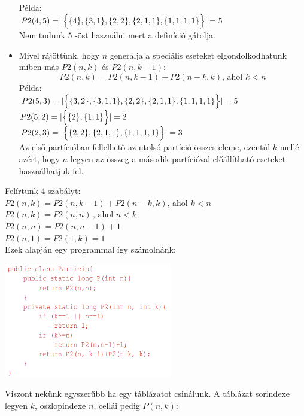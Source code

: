 \documentclass{article}
\theoremstyle{mytheoremstyle}
\theoremstyle{mytheoremstyle}
\theoremstyle{myproblemstyle}
\begin{document}
\begin{itemize}
Példa:\\
$P2(4,5) = |\Bigl\{\{4\},\{3,1\},\{2,2\},\{2,1,1\},
\{1,1,1,1\}\Bigr\}|=5$\\ 
Nem tudunk $5$ -öst használni mert a definíció gátolja.
\item
Mivel rájöttünk, hogy $n$ generálja a speciális eseteket 
elgondolkodhatunk miben más $P2(n,k)$ és $P2(n,k-1):$
$$P2(n,k) = P2(n,k-1) + P2(n-k,k)\text{, ahol }k<n$$
Példa:\\
$P2(5,3) = |\Bigl\{\{3,2\},\{3,1,1\},\{2,2\},\{2,1,1\},\{1,1,1,1\}\Bigr\}|=5$\\ 
$P2(5,2) = |\Bigl\{\{2\},\{1,1\}\Bigr\}|=2$\\ 
$P2(2,3) = |\Bigl\{\{2,2\},\{2,1,1\},\{1,1,1,1\}\Bigr\}|=3$\\ 
Az első partícióban fellelhető az utolsó partíció összes eleme, ezentúl
$k$ mellé azért, hogy $n$ legyen az összeg a második 
partícióval előállítható eseteket használhatjuk fel.

\end{itemize}
Felírtunk 4 szabályt:\\
$P2(n,k) = P2(n,k-1) + P2(n-k,k)\text{, ahol }k<n$\\
$P2(n,k) = P2(n,n)\,\text{, ahol }n<k$\\
$P2(n,n) = P2(n,n-1) + 1$\\
$P2(n,1) = P2(1,k) = 1$\\
Ezek alapján egy programmal így számolnánk:\\
\begin{center}
    \includegraphics[height=5cm]{particiok}
\end{center}
Viszont nekünk egyszerűbb ha egy táblázatot csinálunk. 
A táblázat sorindexe legyen $k$, oszlopindexe $n$, cellái pedig 
$P(n,k)$: 
\end{document}

